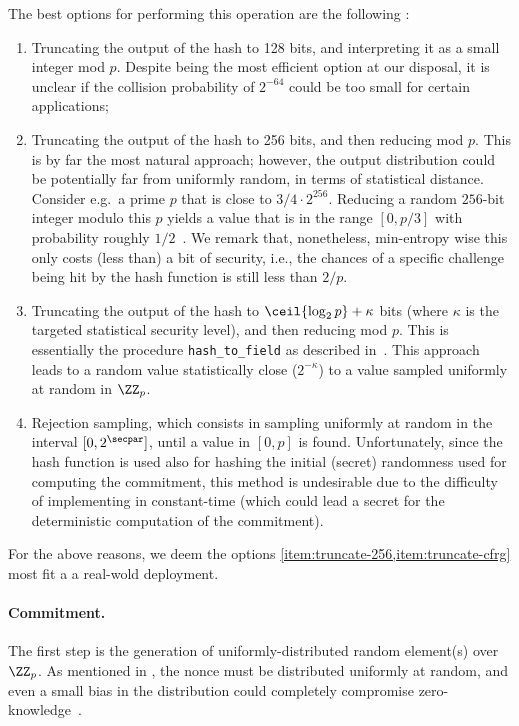\documentclass[runningheads]{llncs}
\begin{document}
 The best options for performing this operation are the following :
\begin{enumerate}[label=$(\alph*)$]
  \item\label{item:truncate-128}  Truncating the output of the hash to 128 bits, and interpreting it as a small integer mod $p$.
  Despite being the most efficient option at our disposal, it is unclear if the collision probability of $2^{-64}$ could be too small for certain applications;
  \item\label{item:truncate-256}  Truncating the output of the hash to 256 bits, and then reducing mod $p$.
  This is by far the most natural approach; however, the output distribution could be potentially far from uniformly random, in terms of statistical distance.
 Consider e.g.\ a prime $p$ that is close to $3/4 \cdot 2^{256}$. Reducing a random $256$-bit integer modulo this $p$ yields a value that is in the range $[0, p / 3]$ with probability roughly $1/2$~\cite{hash-to-curve}.
  We remark that, nonetheless, min-entropy wise this only costs (less than) a bit of security, i.e., the chances of a specific challenge being hit by the hash function is still less than $2/p$.
  \item\label{item:truncate-cfrg} Truncating the output of the hash to $\ceil{\log_2 p} + \kappa$ bits (where $\kappa$ is the targeted statistical
  security level), and then reducing mod $p$.
  This is essentially the procedure
  \verb|hash_to_field| as described in~\cite[Section 5]{hash-to-curve}.
  This approach leads to a random value statistically close ($2^{-\kappa}$) to a value sampled uniformly at random in $\ZZ_p$.
  \item Rejection sampling, which consists in sampling uniformly at random in the interval $[0, 2^\secpar]$, until a value in $[0, p]$ is found.
  Unfortunately, since the hash function is used also for hashing the initial (secret) randomness used for computing the commitment, this method is undesirable due to the difficulty of implementing in constant-time (which could lead a secret for the deterministic computation of the commitment).
\end{enumerate}
For the above reasons, we deem the options \cref{item:truncate-256,item:truncate-cfrg} most fit a a real-wold deployment.

\paragraph{Commitment.} The first step is the generation of uniformly-distributed random element(s) over $\ZZ_p$. As mentioned in , the nonce must be distributed uniformly at random, and even a small bias in the distribution could completely compromise zero-knowledge~\cite{XX}.
\end{document}
